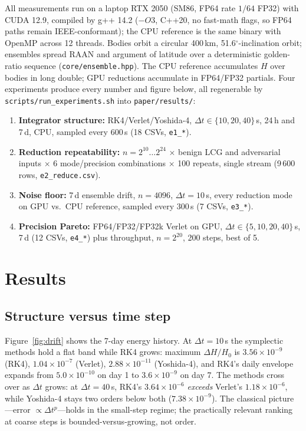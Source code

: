 \documentclass[conference]{IEEEtran}
\begin{document}
All measurements run on a laptop RTX 2050 (SM86, FP64 rate $1/64$ FP32)
with CUDA 12.9, compiled by g++ 14.2 ($-O3$, C++20, no fast-math flags, so
FP64 paths remain IEEE-conformant); the CPU reference is the same binary
with OpenMP across 12 threads. Bodies orbit a circular 400\,km,
51.6$^\circ$-inclination orbit; ensembles spread RAAN and argument of
latitude over a deterministic golden-ratio sequence
(\texttt{core/ensemble.hpp}). The CPU reference accumulates $H$ over
bodies in long double; GPU reductions accumulate in FP64/FP32 partials.
Four
experiments produce every number and figure below, all regenerable by
\texttt{scripts/run\_experiments.sh} into \texttt{paper/results/}:

\begin{enumerate}
\item[\textbf{E1}] \textbf{Integrator structure:} RK4/Verlet/Yoshida-4,
      $\Delta t\in\{10,20,40\}$\,s, 24\,h and 7\,d, CPU, sampled every
      600\,s (18 CSVs, \texttt{e1\_*}).
\item[\textbf{E2}] \textbf{Reduction repeatability:} $n=2^{10}\ldots2^{24}$
      $\times$ benign LCG and adversarial inputs $\times$ 6
      mode/precision combinations $\times$ 100 repeats, single stream
      (9\,600 rows, \texttt{e2\_reduce.csv}).
\item[\textbf{E3}] \textbf{Noise floor:} 7\,d ensemble drift, $n=4096$,
      $\Delta t=10$\,s, every reduction mode on GPU vs.\ CPU reference,
      sampled every 300\,s (7 CSVs, \texttt{e3\_*}).
\item[\textbf{E4}] \textbf{Precision Pareto:} FP64/FP32/FP32k Verlet on GPU,
      $\Delta t\in\{5,10,20,40\}$\,s, 7\,d (12 CSVs, \texttt{e4\_*}) plus
      throughput, $n=2^{20}$, 200 steps, best of 5.
\end{enumerate}

\section{Results}
\label{sec:results}

\subsection{Structure versus time step}
\label{sec:e1}
Figure~\ref{fig:drift} shows the 7-day energy history. At
$\Delta t=10$\,s the symplectic methods hold a flat band while RK4 grows:
maximum $\Delta H/H_0$ is $3.56\times10^{-9}$ (RK4), $1.04\times10^{-7}$
(Verlet), $2.88\times10^{-11}$ (Yoshida-4), and RK4's daily envelope
expands from $5.0\times10^{-10}$ on day 1 to $3.6\times10^{-9}$ on day 7.
The methods cross over as $\Delta t$ grows: at $\Delta t=40$\,s, RK4's
$3.64\times10^{-6}$ \emph{exceeds} Verlet's $1.18\times10^{-6}$, while
Yoshida-4 stays two orders below both ($7.38\times10^{-9}$). The classical
picture---error $\propto\Delta t^p$---holds in the small-step regime;
the practically relevant ranking at coarse steps is bounded-versus-growing,
not order.
\end{document}
